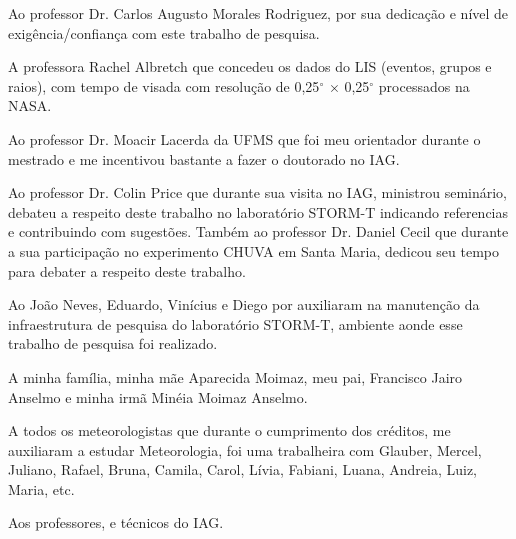 \documentclass[12pt,a4paper,tocpage=plain,floatnumber=continuous,chapter=TITLE,appendix=nobox,font=plain, header=ruled,hyperindex=false]{abnt}
\begin{document}
Ao professor Dr. Carlos Augusto Morales Rodriguez, por sua dedicação e nível de exigência/confiança com este trabalho de pesquisa. 

A professora Rachel Albretch que concedeu os dados do LIS (eventos, grupos e raios), com tempo de visada com resolução de 0,25$^{\circ}$ $\times$ 0,25$^{\circ}$ processados na NASA.

Ao professor Dr. Moacir Lacerda da UFMS que foi meu orientador durante o mestrado e me incentivou bastante a fazer o doutorado no IAG.

Ao professor Dr. Colin Price que durante sua visita no IAG, ministrou seminário, debateu a respeito deste trabalho no laboratório STORM-T indicando referencias e contribuindo com sugestões. Também ao professor Dr. Daniel Cecil que durante a sua participação no experimento CHUVA em Santa Maria, dedicou seu tempo para debater a respeito deste trabalho.   

Ao João Neves, Eduardo, Vinícius e Diego por auxiliaram na manutenção da infraestrutura de pesquisa do laboratório STORM-T, ambiente aonde esse trabalho de pesquisa foi realizado.

A minha família, minha mãe Aparecida Moimaz, meu pai, Francisco Jairo Anselmo e minha irmã Minéia Moimaz Anselmo. 

A todos os meteorologistas que durante o cumprimento dos créditos, me auxiliaram a estudar Meteorologia, foi uma trabalheira com  Glauber, Mercel, Juliano, Rafael, Bruna, Camila, Carol, Lívia, Fabiani, Luana, Andreia, Luiz, Maria, etc.

Aos professores, e técnicos do IAG.
\end{document}
